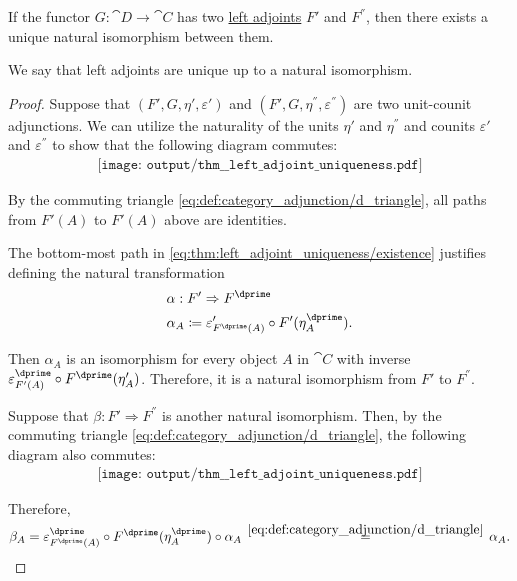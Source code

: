 \begin{proposition}\label{thm:left_adjoint_uniqueness}
  If the functor \( G: \cat{D} \to \cat{C} \) has two \hyperref[def:category_adjunction]{left adjoints} \( F' \) and \( F^\dprime \), then there exists a unique natural isomorphism between them.

  We say that left adjoints are unique up to a natural isomorphism.
\end{proposition}
\begin{proof}
   Suppose that \( (F', G, \eta', \varepsilon') \) and \( (F', G, \eta^\dprime, \varepsilon^\dprime) \) are two unit-counit adjunctions. We can utilize the naturality of the units \( \eta' \) and \( \eta^\dprime \) and counits \( \varepsilon' \) and \( \varepsilon^\dprime \) to show that the following diagram commutes:
  \begin{equation}\label{eq:thm:left_adjoint_uniqueness/existence}
    \begin{aligned}
      \texttt{[image: output/thm\_\_left\_adjoint\_uniqueness.pdf]}
    \end{aligned}
  \end{equation}

  By the commuting triangle \eqref{eq:def:category_adjunction/d_triangle}, all paths from \( F'(A) \) to \( F'(A) \) above are identities.

  The bottom-most path in \eqref{eq:thm:left_adjoint_uniqueness/existence} justifies defining the natural transformation
  \begin{equation*}
    \begin{aligned}
      &\alpha: F' \Rightarrow F^\dprime \\
      &\alpha_A \coloneqq \varepsilon'_{F^\dprime(A)} \bincirc F'(\eta_A^\dprime).
    \end{aligned}
  \end{equation*}

  Then \( \alpha_A \) is an isomorphism for every object \( A \) in \( \cat{C} \) with inverse \( \varepsilon_{F'(A)}^\dprime \bincirc F^\dprime(\eta_A') \). Therefore, it is a natural isomorphism from \( F' \) to \( F^\dprime \).

   Suppose that \( \beta: F' \Rightarrow F^\dprime \) is another natural isomorphism. Then, by the commuting triangle \eqref{eq:def:category_adjunction/d_triangle}, the following diagram also commutes:
  \begin{equation}\label{eq:thm:left_adjoint_uniqueness/uniqueness}
    \begin{aligned}
      \texttt{[image: output/thm\_\_left\_adjoint\_uniqueness.pdf]}
    \end{aligned}
  \end{equation}

  Therefore,
  \begin{equation*}
    \beta_A
    =
    \varepsilon^\dprime_{F^\dprime(A)} \bincirc F^\dprime(\eta^\dprime_A) \bincirc \alpha_A
    \reloset {\eqref{eq:def:category_adjunction/d_triangle}} =
    \alpha_A.
  \end{equation*}
\end{proof}

